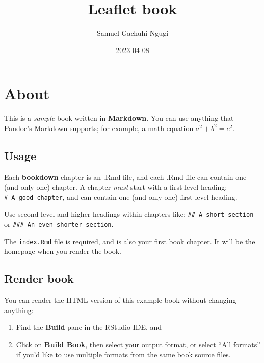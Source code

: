 \documentclass[
]{book}
\title{Leaflet book}
\author{Samuel Gachuhi Ngugi}
\date{2023-04-08}
\theoremstyle{definition}
\theoremstyle{definition}
\theoremstyle{definition}
\theoremstyle{definition}
\theoremstyle{remark}
\begin{document}
\maketitle

{
\setcounter{tocdepth}{1}
\tableofcontents
}
\hypertarget{about}{%
\chapter*{About}\label{about}}

This is a \emph{sample} book written in \textbf{Markdown}. You can use anything that Pandoc's Markdown supports; for example, a math equation \(a^2 + b^2 = c^2\).

\hypertarget{usage}{%
\section*{Usage}\label{usage}}

Each \textbf{bookdown} chapter is an .Rmd file, and each .Rmd file can contain one (and only one) chapter. A chapter \emph{must} start with a first-level heading: \texttt{\#\ A\ good\ chapter}, and can contain one (and only one) first-level heading.

Use second-level and higher headings within chapters like: \texttt{\#\#\ A\ short\ section} or \texttt{\#\#\#\ An\ even\ shorter\ section}.

The \texttt{index.Rmd} file is required, and is also your first book chapter. It will be the homepage when you render the book.

\hypertarget{render-book}{%
\section*{Render book}\label{render-book}}

You can render the HTML version of this example book without changing anything:

\begin{enumerate}
\def\labelenumi{\arabic{enumi}.}
\item
  Find the \textbf{Build} pane in the RStudio IDE, and
\item
  Click on \textbf{Build Book}, then select your output format, or select ``All formats'' if you'd like to use multiple formats from the same book source files.
\end{enumerate}
\end{document}
